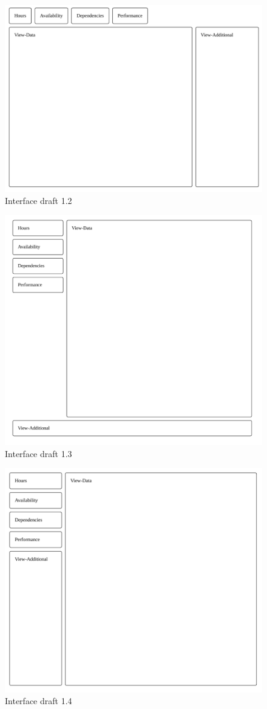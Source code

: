   \begin{figure}
    \center
    \includegraphics[width=0.75\linewidth]{ui12.pdf}
    \caption{Interface draft 1.2}
  \end{figure}

  \begin{figure}
    \center
    \includegraphics[width=0.75\linewidth]{ui13.pdf}
    \caption{Interface draft 1.3}
  \end{figure}

  \begin{figure}
    \center
    \includegraphics[width=0.75\linewidth]{ui14.pdf}
    \caption{Interface draft 1.4}
  \end{figure}

